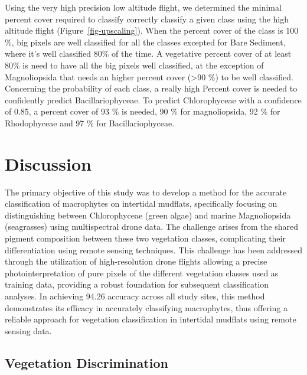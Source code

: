 \documentclass[
  number]{elsarticle}
\begin{document}
Using the very high precision low altitude flight, we determined the
minimal percent cover required to classify correctly classify a given
class using the high altitude flight (Figure~\ref{fig-upscaling}). When
the percent cover of the class is 100 \%, big pixels are well classified
for all the classes excepted for Bare Sediment, where it's well
classified 80\% of the time. A vegetative percent cover of at least 80\%
is need to have all the big pixels well classified, at the exception of
Magnoliopsida that needs an higher percent cover (\textgreater90 \%) to
be well classified. Concerning the probability of each class, a really
high Percent cover is needed to confidently predict Bacillariophyceae.
To predict Chlorophyceae with a confidence of 0.85, a percent cover of
93 \% is needed, 90 \% for magnoliopsida, 92 \% for Rhodophyceae and 97
\% for Bacillariophyceae.

\section{Discussion}\label{discussion}

The primary objective of this study was to develop a method for the
accurate classification of macrophytes on intertidal mudflats,
specifically focusing on distinguishing between Chlorophyceae (green
algae) and marine Magnoliopsida (seagrasses) using multispectral drone
data. The challenge arises from the shared pigment composition between
these two vegetation classes, complicating their differentiation using
remote sensing techniques. This challenge has been addressed through the
utilization of high-resolution drone flights allowing a precise
photointerpretation of pure pixels of the different vegetation classes
used as training data, providing a robust foundation for subsequent
classification analyses. In achieving 94.26 accuracy across all study
sites, this method demonstrates its efficacy in accurately classifying
macrophytes, thus offering a reliable approach for vegetation
classification in intertidal mudflats using remote sensing data.

\subsection{Vegetation Discrimination}\label{vegetation-discrimination}
\end{document}

